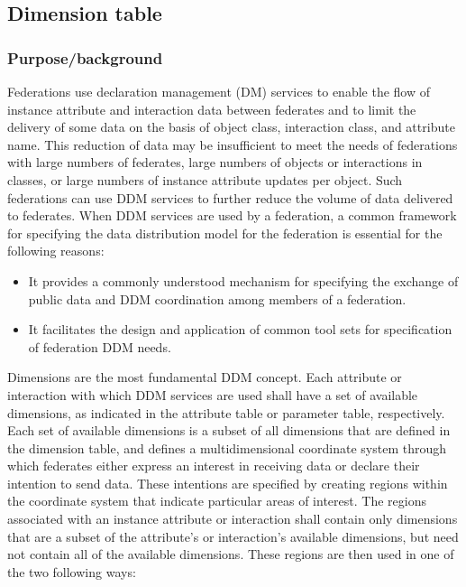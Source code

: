 \newpage

\subsection{Dimension table}

\subsubsection{Purpose/background}
Federations use declaration management (DM) services to enable the flow of instance attribute and interaction data between federates and to limit the delivery of some data on the basis of object class, interaction class, and attribute name. This reduction of data may be insufficient to meet the needs of federations with large numbers of federates, large numbers of objects or interactions in classes, or large numbers of instance attribute updates per object. Such federations can use DDM services to further reduce the volume of data delivered to federates. When DDM services are used by a federation, a common framework for specifying the data distribution model for the federation is essential for the following reasons:
\begin{itemize}[topsep=1pt,itemsep=2pt]
\item It provides a commonly understood mechanism for specifying the exchange of public data and DDM coordination among members of a federation.
\item It facilitates the design and application of common tool sets for specification of federation DDM needs.
\end{itemize}

Dimensions are the most fundamental DDM concept. Each attribute or interaction with which DDM services are used shall have a set of available dimensions, as indicated in the attribute table or parameter table, respectively. Each set of available dimensions is a subset of all dimensions that are defined in the dimension table, and defines a multidimensional coordinate system through which federates either express an interest in receiving data or declare their intention to send data. These intentions are specified by creating regions within the coordinate system that indicate particular areas of interest. The regions associated with an instance attribute or interaction shall contain only dimensions that are a subset of the attribute's or interaction's available dimensions, but need not contain all of the available dimensions. These regions are then used in one of the two following ways:

